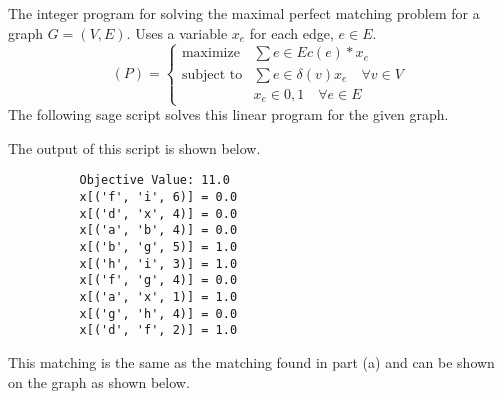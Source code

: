 \documentclass[11pt, oneside]{article}
\begin{document}
\begin{enumerate}
\begin{enumerate}
        The integer program for solving the maximal perfect matching problem
        for a graph $G = (V, E)$.
        Uses a variable $x_e$ for each edge, $e \in E$.
        \[
          (P)=
          \begin{cases}
            \text{maximize} & \sum{e \in E}{}{c(e)*x_e} \\
            \text{subject to} & \sum{e \in \delta(v)}{}{x_e} \quad \forall v \in V \\
                              & x_e \in {0, 1} \quad \forall e \in E
          \end{cases}
        \]
        The following sage script solves this linear program for the given graph.
        
        The output of this script is shown below.
        \begin{verbatim}
          Objective Value: 11.0
          x[('f', 'i', 6)] = 0.0
          x[('d', 'x', 4)] = 0.0
          x[('a', 'b', 4)] = 0.0
          x[('b', 'g', 5)] = 1.0
          x[('h', 'i', 3)] = 1.0
          x[('f', 'g', 4)] = 0.0
          x[('a', 'x', 1)] = 1.0
          x[('g', 'h', 4)] = 0.0
          x[('d', 'f', 2)] = 1.0
        \end{verbatim}
        This matching is the same as the matching found in part (a) and can be
        shown on the graph as shown below.
        \begin{center}
        \end{center}
    \end{enumerate}


\end{enumerate}
\end{document}
